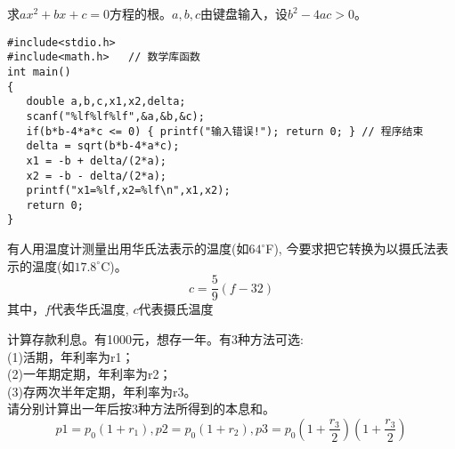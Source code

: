 \begin{frame}[fragile]
\begin{example}[例3.5 p64]
	求$ax^2+bx+c=0$方程的根。$a,b,c$由键盘输入，设$b^2-4ac>0$。
\end{example}
\begin{lstlisting}
#include<stdio.h>
#include<math.h>   // 数学库函数        
int main()                   
{                            
   double a,b,c,x1,x2,delta;
   scanf("%lf%lf%lf",&a,&b,&c);
   if(b*b-4*a*c <= 0) { printf("输入错误!"); return 0; } // 程序结束
   delta = sqrt(b*b-4*a*c);
   x1 = -b + delta/(2*a);
   x2 = -b - delta/(2*a);
   printf("x1=%lf,x2=%lf\n",x1,x2);
   return 0;           
}                            
\end{lstlisting}
\end{frame}

\begin{frame}[shrink]
\begin{example}[例3.1 p37]
	有人用温度计测量出用华氏法表示的温度(如$64^\circ$F), 
	今要求把它转换为以摄氏法表示的温度(如$17.8^\circ$C)。
	\[ c=\frac{5}{9}(f-32) \]
	其中，$f$代表华氏温度, $c$代表摄氏温度
\end{example}
\begin{example}[例3.2 p38]
	计算存款利息。有1000元，想存一年。有3种方法可选:\\
	(1)活期，年利率为r1；\\
	(2)一年期定期，年利率为r2；\\
	(3)存两次半年定期，年利率为r3。\\
	请分别计算出一年后按3种方法所得到的本息和。\\
	\[p1=p_0(1+r_1),p2=p_0(1+r_2),p3=p_0(1+\frac{r_3}{2})(1+\frac{r_3}{2}) \]
\end{example}
\end{frame}




